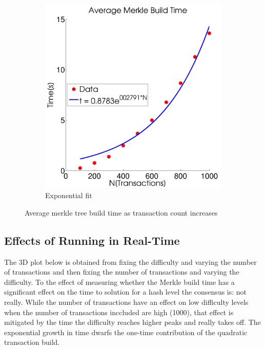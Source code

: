 \documentclass[pdftex,11pt]{article}
\begin{document}
\begin{figure}[H]
\begin{subfigure}[H]{0.4\textwidth}
		\includegraphics[width=\textwidth]{figures/MerkExp.pdf}
		\caption{Exponential fit}
	\end{subfigure}
	\caption{Average merkle tree build time as transaction count increases}
	\label{fig:merk}
\end{figure}

\subsection{Effects of Running in Real-Time}

The 3D plot below is obtained from fixing the difficulty and varying the number of transactions and then fixing the number of transactions and varying the difficulty.  To the effect of measuring whether the Merkle build time has a significant effect on the time to solution for a hash level the consensus is: not really. While the number of transactions have an effect on low difficulty levels when the number of transactions inccluded are high (1000), that effect is mitigated by the time the difficulty reaches higher peaks and really takes off. The exponential growth in time dwarfs the one-time contribution of the quadratic transaction build. 
\end{document}
